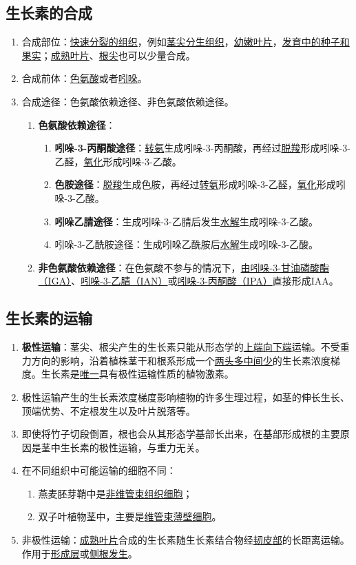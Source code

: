 \subsection{生长素的合成}
\begin{enumerate}
    \item 合成部位：\uline{快速分裂的组织}，例如\uline{茎尖分生组织}，\uline{幼嫩叶片}，\uline{发育中的种子和果实}；\uline{成熟叶片}、\uline{根尖}也可以少量合成。
    \item 合成前体：\uline{色氨酸}或者\uline{吲哚}。
    \item 合成途径：色氨酸依赖途径、非色氨酸依赖途径。
    \begin{enumerate}
        \item \textbf{色氨酸依赖途径}：
        \begin{enumerate}
            \item \textbf{吲哚-3-丙酮酸途径}：\uline{转氨}生成吲哚-3-丙酮酸，再经过\uline{脱羧}形成吲哚-3-乙醛，\uline{氧化}形成吲哚-3-乙酸。
            \item \textbf{色胺途径}：\uline{脱羧}生成色胺，再经过\uline{转氨}形成吲哚-3-乙醛，\uline{氧化}形成吲哚-3-乙酸。
            \item \textbf{吲哚乙腈途径}：生成吲哚-3-乙腈后发生\uline{水解}生成吲哚-3-乙酸。
            \item 吲哚-3-乙酰胺途径：生成吲哚乙酰胺后\uline{水解}生成吲哚-3-乙酸。
        \end{enumerate}
        \item \textbf{非色氨酸依赖途径}：在色氨酸不参与的情况下，\uline{由吲哚-3-甘油磷酸酯（IGA）}、\uline{吲哚-3-乙腈（IAN）}或\uline{吲哚-3-丙酮酸（IPA）}直接形成IAA。
    \end{enumerate}    
\end{enumerate}
\subsection{生长素的运输}
\begin{enumerate}
    \item \textbf{极性运输}：茎尖、根尖产生的生长素只能从形态学的\uline{上端向下端}运输。不受重力方向的影响，沿着植株茎干和根系形成一个\uline{两头多中间少}的生长素浓度梯度。生长素是\uline{唯一}具有极性运输性质的植物激素。
    \item 极性运输产生的生长素浓度梯度影响植物的许多生理过程，如茎的伸长生长、顶端优势、不定根发生以及叶片脱落等。
    \item 即使将竹子切段倒置，根也会从其形态学基部长出来，在基部形成根的主要原因是茎中生长素的极性运输，与重力无关。
    \item 在不同组织中可能运输的细胞不同：
    \begin{enumerate}
        \item 燕麦胚芽鞘中是\uline{非维管束组织细胞}；
        \item 双子叶植物茎中，主要是\uline{维管束薄壁细胞}。
    \end{enumerate}
    \item 非极性运输：\uline{成熟叶片}合成的生长素随生长素结合物经\uline{韧皮部}的长距离运输。作用于\uline{形成层}或\uline{侧根发生}。
\end{enumerate}
